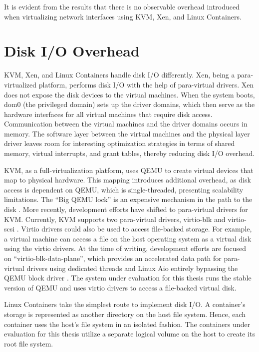 It is evident from the results that there is no observable overhead introduced when virtualizing network interfaces using KVM, Xen, and Linux Containers.


\section{Disk I/O Overhead}

KVM, Xen, and Linux Containers handle disk I/O differently. Xen, being a para-virtualized platform, performs disk I/O with the help of para-virtual drivers. Xen does not expose the disk devices to the virtual machines. When the system boots, dom0 (the privileged domain) sets up the driver domains, which then serve as the hardware interfaces for all virtual machines that require disk access. Communication between the virtual machines and the driver domains occurs in memory. The software layer between the virtual machines and the physical layer driver leaves room for interesting optimization strategies in terms of shared memory, virtual interrupts, and grant tables, thereby reducing disk I/O overhead. 

KVM, as a full-virtualization platform, uses QEMU to create virtual devices that map to physical hardware. This mapping introduces additional overhead, as disk access is dependent on QEMU, which is single-threaded, presenting scalability limitations. The ``Big QEMU lock'' is an expensive mechanism in the path to the disk \cite{bql}. More recently, development efforts have shifted to para-virtual drivers for KVM. Currently, KVM supports two para-virtual drivers, virtio-blk \cite{virtioblk} and virtio-scsi \cite{virtioscsi}. Virtio drivers could also be used to access file-backed storage. For example, a virtual machine can access a file on the host operating system as a virtual disk using the virtio drivers. At the time of writing, development efforts are focused on ``virtio-blk-data-plane'', which provides an accelerated data path for para-virtual drivers using dedicated threads and Linux Aio \cite{aio} entirely bypassing the QEMU block driver \cite{blkdataplane}. The system under evaluation for this thesis runs the stable version of QEMU and uses virtio drivers to access a file-backed virtual disk.  

Linux Containers take the simplest route to implement disk I/O. A container's storage is represented as another directory on the host file system. Hence, each container uses the host's file system in an isolated fashion. The containers under evaluation for this thesis utilize a separate logical volume on the host to create its root file system.


